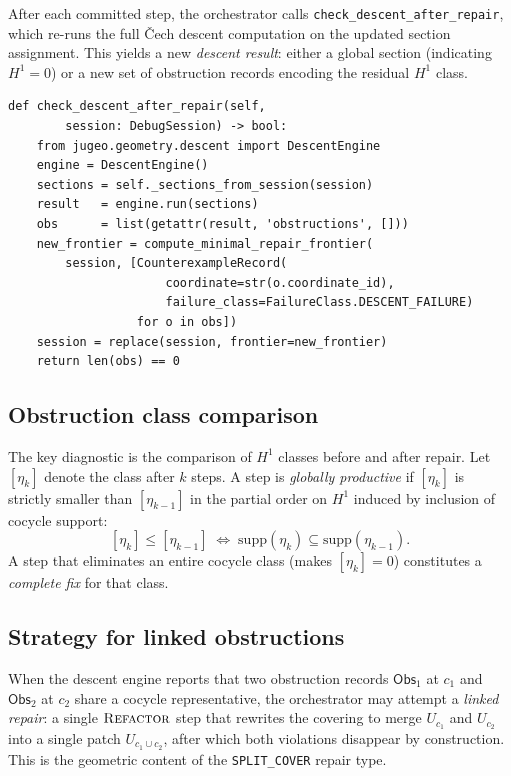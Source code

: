 \documentclass[11pt]{article}
\newcommand{\Refactor}{\textsc{Refactor}}
\begin{document}
After each committed step, the orchestrator calls
\texttt{check\_descent\_after\_repair}, which re-runs the full Čech descent
computation on the updated section assignment.  This yields a new
\emph{descent result}: either a global section (indicating $H^1 = 0$) or a
new set of obstruction records encoding the residual $H^1$ class.

\begin{lstlisting}[style=jugeo-python,caption={Descent re-check after repair (repair\_execution.py).}]
def check_descent_after_repair(self,
        session: DebugSession) -> bool:
    from jugeo.geometry.descent import DescentEngine
    engine = DescentEngine()
    sections = self._sections_from_session(session)
    result   = engine.run(sections)
    obs      = list(getattr(result, 'obstructions', []))
    new_frontier = compute_minimal_repair_frontier(
        session, [CounterexampleRecord(
                      coordinate=str(o.coordinate_id),
                      failure_class=FailureClass.DESCENT_FAILURE)
                  for o in obs])
    session = replace(session, frontier=new_frontier)
    return len(obs) == 0
\end{lstlisting}

\subsection{Obstruction class comparison}

The key diagnostic is the comparison of $H^1$ classes before and after repair.
Let $[\eta_k]$ denote the class after $k$ steps.  A step is \emph{globally
productive} if $[\eta_{k}]$ is strictly smaller than $[\eta_{k-1}]$ in the
partial order on $H^1$ induced by inclusion of cocycle support:
\[
  [\eta_k] \leq [\eta_{k-1}]
  \;\iff\;
  \mathrm{supp}(\eta_k) \subseteq \mathrm{supp}(\eta_{k-1}).
\]
A step that eliminates an entire cocycle class (\ie makes $[\eta_k] = 0$)
constitutes a \emph{complete fix} for that class.

\subsection{Strategy for linked obstructions}

When the descent engine reports that two obstruction records $\mathsf{Obs}_1$
at $c_1$ and $\mathsf{Obs}_2$ at $c_2$ share a cocycle representative, the
orchestrator may attempt a \emph{linked repair}: a single $\Refactor$ step
that rewrites the covering to merge $U_{c_1}$ and $U_{c_2}$ into a single
patch $U_{c_1 \cup c_2}$, after which both violations disappear by
construction.  This is the geometric content of the \texttt{SPLIT\_COVER}
repair type.
\end{document}
